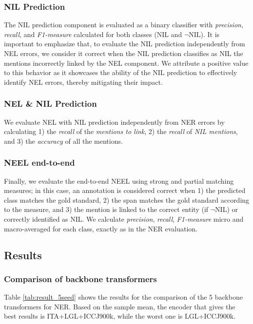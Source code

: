\subsubsection{NIL Prediction}
The NIL prediction component is evaluated as a binary classifier with \textit{precision}, \textit{recall}, and \textit{F1-measure} calculated for both classes (NIL and $\neg$NIL). It is important to emphasize that, to evaluate the NIL prediction independently from NEL errors, we consider it correct when the NIL prediction classifies as NIL the mentions incorrectly linked by the NEL component. We attribute a positive value to this behavior as it showcases the ability of the NIL prediction to effectively identify NEL errors, thereby mitigating their impact.

\subsubsection{NEL \& NIL Prediction}
We evaluate NEL with NIL prediction independently from NER errors by calculating 1) the \textit{recall} of the \textit{mentions to link}, 2) the \textit{recall} of \textit{NIL mentions}, and 3) the \textit{accuracy} of all the mentions.

\subsubsection{NEEL end-to-end}
Finally, we evaluate the end-to-end NEEL using strong and partial matching measures; in this case, an annotation is considered correct when 1) the predicted class matches the gold standard, 2) the span matches the gold standard according to the measure, and 3) the mention is linked to the correct entity (if $\neg$NIL) or correctly identified as NIL. We calculate \textit{precision}, \textit{recall}, \textit{F1-measure} micro and macro-averaged for each class, exactly as in the NER evaluation.

\subsection{Results}

\subsubsection{Comparison of backbone transformers}
Table \ref{tab:result_5seed} shows the results for the comparison of the 5 backbone transformers for NER.
Based on the sample mean, the encoder that gives the best results is ITA+LGL+ICCJ900k, while the worst one is LGL+ICCJ900k.

